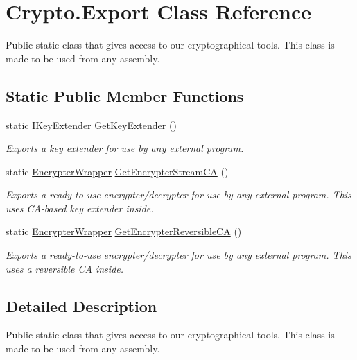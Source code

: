 \hypertarget{class_crypto_1_1_export}{}\section{Crypto.\+Export Class Reference}
\label{class_crypto_1_1_export}


Public static class that gives access to our cryptographical tools. This class is made to be used from any assembly.  


\subsection*{Static Public Member Functions}
\begin{DoxyCompactItemize}
\item 
static \hyperlink{interface_crypto_1_1_i_key_extender}{I\+Key\+Extender} \hyperlink{class_crypto_1_1_export_a32a0f5d57f02adbe05c8b9c6ca2d30fe}{Get\+Key\+Extender} ()
\begin{DoxyCompactList}\small\item\em Exports a key extender for use by any external program. \end{DoxyCompactList}\item 
static \hyperlink{class_crypto_1_1_encrypter_wrapper}{Encrypter\+Wrapper} \hyperlink{class_crypto_1_1_export_afbdd82980115f75656284bfc1cedaf71}{Get\+Encrypter\+Stream\+C\+A} ()
\begin{DoxyCompactList}\small\item\em Exports a ready-\/to-\/use encrypter/decrypter for use by any external program. This uses C\+A-\/based key extender inside. \end{DoxyCompactList}\item 
static \hyperlink{class_crypto_1_1_encrypter_wrapper}{Encrypter\+Wrapper} \hyperlink{class_crypto_1_1_export_a724346aca326fe3f8725eb7c7c3a4390}{Get\+Encrypter\+Reversible\+C\+A} ()
\begin{DoxyCompactList}\small\item\em Exports a ready-\/to-\/use encrypter/decrypter for use by any external program. This uses a reversible C\+A inside. \end{DoxyCompactList}\end{DoxyCompactItemize}


\subsection{Detailed Description}
Public static class that gives access to our cryptographical tools. This class is made to be used from any assembly. 



